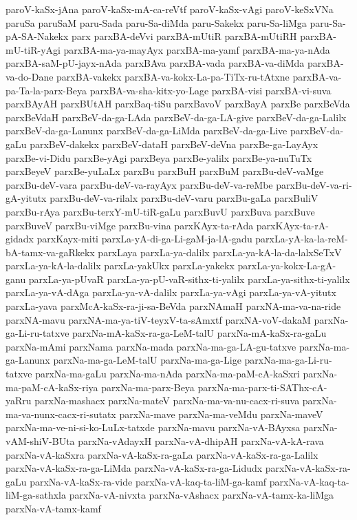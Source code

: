 {paroV-kaSx-jAna
paroV-kaSx-mA-ca-reVtf
paroV-kaSx-vAgi
paroV-keSxVNa
paruSa
paruSaM
paru-Sada
paru-Sa-diMda
paru-Sakekx
paru-Sa-liMga
paru-Sa-pA-SA-Nakekx
parx
parxBA-deVvi
parxBA-mUtiR
parxBA-mUtiRH
parxBA-mU-tiR-yAgi
parxBA-ma-ya-mayAyx
parxBA-ma-yamf
parxBA-ma-ya-nAda
parxBA-saM-pU-jayx-nAda
parxBAva
parxBA-vada
parxBA-va-diMda
parxBA-va-do-Dane
parxBA-vakekx
parxBA-va-kokx-La-pa-TiTx-ru-tAtxne
parxBA-va-pa-Ta-la-parx-Beya
parxBA-va-sha-kitx-yo-Lage
parxBA-visi
parxBA-vi-suva
parxBAyAH
parxBUtAH
parxBaq-tiSu
parxBavoV
parxBayA
parxBe
parxBeVda
parxBeVdaH
parxBeV-da-ga-LAda
parxBeV-da-ga-LA-give
parxBeV-da-ga-Lalilx
parxBeV-da-ga-Lanunx
parxBeV-da-ga-LiMda
parxBeV-da-ga-Live
parxBeV-da-gaLu
parxBeV-dakekx
parxBeV-dataH
parxBeV-deVna
parxBe-ga-LayAyx
parxBe-vi-Didu
parxBe-yAgi
parxBeya
parxBe-yalilx
parxBe-ya-nuTuTx
parxBeyeV
parxBe-yuLaLx
parxBu
parxBuH
parxBuM
parxBu-deV-vaMge
parxBu-deV-vara
parxBu-deV-va-rayAyx
parxBu-deV-va-reMbe
parxBu-deV-va-ri-gA-yitutx
parxBu-deV-va-rilalx
parxBu-deV-varu
parxBu-gaLa
parxBuliV
parxBu-rAya
parxBu-terxY-mU-tiR-gaLu
parxBuvU
parxBuva
parxBuve
parxBuveV
parxBu-viMge
parxBu-vina
parxKAyx-ta-rAda
parxKAyx-ta-rA-gidadx
parxKayx-miti
parxLa-yA-di-ga-Li-gaM-ja-lA-gadu
parxLa-yA-ka-la-reM-bA-tamx-va-gaRkekx
parxLaya
parxLa-ya-dalilx
parxLa-ya-kA-la-da-lalxSeTxV
parxLa-ya-kA-la-dalilx
parxLa-yakUkx
parxLa-yakekx
parxLa-ya-kokx-La-gA-ganu
parxLa-ya-pUvaR
parxLa-ya-pU-vaR-sithx-ti-yalilx
parxLa-ya-sithx-ti-yalilx
parxLa-ya-vA-dAga
parxLa-ya-vA-dalilx
parxLa-ya-vAgi
parxLa-ya-vA-yitutx
parxLa-yava
parxMcA-kaSx-ra-ji-sa-BeVda
parxNAmaH
parxNA-ma-va-na-ride
parxNA-mavu
parxNA-ma-ya-tiV-teyxV-ta-sAmxtf
parxNA-voV-dakaM
parxNa-ga-Li-ru-tatxve
parxNa-mA-kaSx-ra-ga-LeM-talU
parxNa-mA-kaSx-ra-gaLu
parxNa-mAmi
parxNama
parxNa-mada
parxNa-ma-ga-LA-gu-tatxve
parxNa-ma-ga-Lanunx
parxNa-ma-ga-LeM-talU
parxNa-ma-ga-Lige
parxNa-ma-ga-Li-ru-tatxve
parxNa-ma-gaLu
parxNa-ma-nAda
parxNa-ma-paM-cA-kaSxri
parxNa-ma-paM-cA-kaSx-riya
parxNa-ma-parx-Beya
parxNa-ma-parx-ti-SAThx-cA-yaRru
parxNa-mashacx
parxNa-mateV
parxNa-ma-va-nu-cacx-ri-suva
parxNa-ma-va-nunx-cacx-ri-sutatx
parxNa-mave
parxNa-ma-veMdu
parxNa-maveV
parxNa-ma-ve-ni-si-ko-LuLx-tatxde
parxNa-mavu
parxNa-vA-BAyxsa
parxNa-vAM-shiV-BUta
parxNa-vAdayxH
parxNa-vA-dhipAH
parxNa-vA-kA-rava
parxNa-vA-kaSxra
parxNa-vA-kaSx-ra-gaLa
parxNa-vA-kaSx-ra-ga-Lalilx
parxNa-vA-kaSx-ra-ga-LiMda
parxNa-vA-kaSx-ra-ga-Lidudx
parxNa-vA-kaSx-ra-gaLu
parxNa-vA-kaSx-ra-vide
parxNa-vA-kaq-ta-liM-ga-kamf
parxNa-vA-kaq-ta-liM-ga-sathxla
parxNa-vA-nivxta
parxNa-vAshacx
parxNa-vA-tamx-ka-liMga
parxNa-vA-tamx-kamf
}

